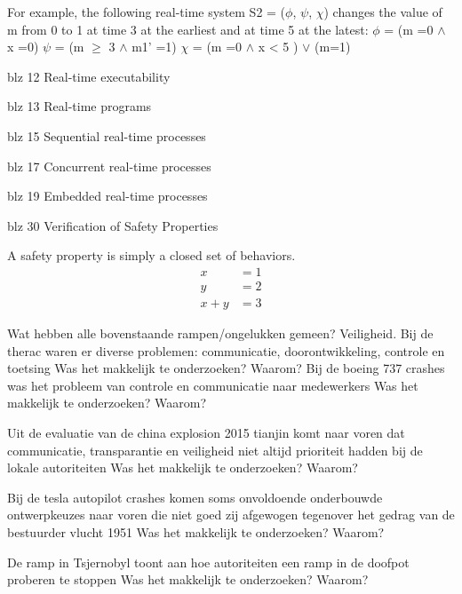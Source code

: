 For example, the following real-time system S2 = ($\phi$, $\psi$, $\chi$)
changes the value of m from 0 to 1 at time 3 at the earliest and at time 5 at the
latest:
$\phi$ = (m =0 $\wedge$ x =0)
$\psi$ = (m $\geq$ 3 $\wedge$ m1' =1)
$\chi$ = (m =0 $\wedge$ x < 5 ) $\vee$ (m=1)

blz 12 Real-time executability

blz 13 Real-time programs

blz 15 Sequential real-time processes


blz 17 Concurrent real-time processes


blz 19 Embedded real-time processes

blz 30 Verification of Safety Properties

A safety property is simply a closed set of behaviors.
\begin{equation*}
	\begin{split}
		x &= 1 \\
		y &= 2 \\
		\hline
		x + y &= 3 
	\end{split}
\end{equation*}








 


Wat hebben alle bovenstaande rampen/ongelukken gemeen? Veiligheid.
Bij de therac waren er diverse problemen: communicatie, doorontwikkeling, controle en toetsing
Was het makkelijk te onderzoeken? Waarom?
Bij de boeing 737 crashes was het probleem van controle en communicatie naar medewerkers
Was het makkelijk te onderzoeken? Waarom?

Uit de evaluatie van de china explosion 2015 tianjin komt naar voren dat communicatie, transparantie en veiligheid niet altijd prioriteit hadden bij de lokale autoriteiten
Was het makkelijk te onderzoeken? Waarom?

Bij de tesla autopilot crashes komen soms onvoldoende onderbouwde ontwerpkeuzes naar voren die niet goed zij  afgewogen tegenover het gedrag van de bestuurder
vlucht 1951
Was het makkelijk te onderzoeken? Waarom?

De ramp in Tsjernobyl toont aan hoe autoriteiten een ramp in de doofpot proberen te stoppen
Was het makkelijk te onderzoeken? Waarom?



